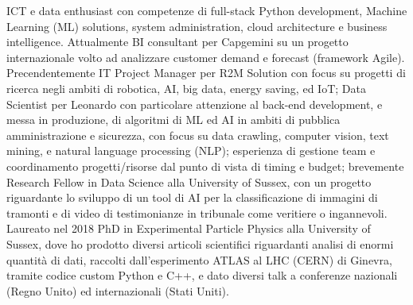 
ICT e data enthusiast con competenze di full-stack Python development, Machine Learning (ML) solutions, system administration, cloud architecture e business intelligence. Attualmente BI consultant per Capgemini su un progetto internazionale volto ad analizzare customer demand e forecast (framework Agile). Precendentemente IT Project Manager per R2M Solution con focus su progetti di ricerca negli ambiti di robotica, AI, big data, energy saving, ed IoT; Data Scientist per Leonardo con particolare attenzione al back-end development, e messa in produzione, di algoritmi di ML ed AI in ambiti di pubblica amministrazione e sicurezza, con focus su data crawling, computer vision, text mining, e natural language processing (NLP); esperienza di gestione team e coordinamento progetti/risorse dal punto di vista di timing e budget; brevemente Research Fellow in Data Science alla University of Sussex, con un progetto riguardante lo sviluppo di un tool di AI per la classificazione di immagini di tramonti e di video di testimonianze in tribunale come veritiere o ingannevoli. Laureato nel 2018 PhD in Experimental Particle Physics alla University of Sussex, dove ho prodotto diversi articoli scientifici riguardanti analisi di enormi quantità di dati, raccolti dall'esperimento ATLAS al LHC (CERN) di Ginevra, tramite codice custom Python e C++, e dato diversi talk a conferenze nazionali (Regno Unito) ed internazionali (Stati Uniti).